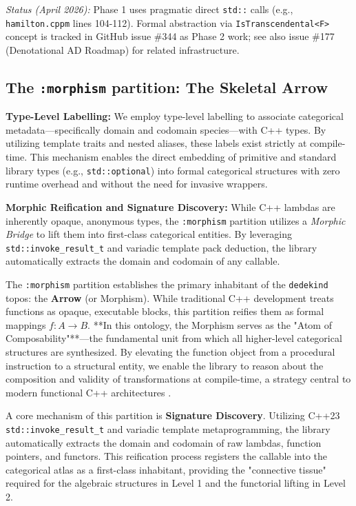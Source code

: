 \documentclass[11pt, a4paper]{report}
\begin{document}
\noindent \emph{Status (April 2026):} Phase 1 uses pragmatic direct \texttt{std::} calls (e.g., \texttt{hamilton.cppm} lines 104-112). Formal abstraction via \texttt{IsTranscendental<F>} concept is tracked in GitHub issue \#344 as Phase 2 work; see also issue \#177 (Denotational AD Roadmap) for related infrastructure.




\subsection{The \texttt{:morphism} partition: The Skeletal Arrow}

\textbf{Type-Level Labelling:} We employ type-level labelling to associate categorical metadata---specifically domain and codomain species---with C++ types. By utilizing template traits and nested aliases, these labels exist strictly at compile-time. This mechanism enables the direct embedding of primitive and standard library types (e.g., \texttt{std::optional}) into formal categorical structures with zero runtime overhead and without the need for invasive wrappers.

\textbf{Morphic Reification and Signature Discovery:} While C++ lambdas are inherently opaque, anonymous types, the \texttt{:morphism} partition utilizes a \textit{Morphic Bridge} to lift them into first-class categorical entities. By leveraging \texttt{std::invoke\_result\_t} and variadic template pack deduction, the library automatically extracts the domain and codomain of any callable. 


The \texttt{:morphism} partition establishes the primary inhabitant of the \texttt{dedekind} topos: the \textbf{Arrow} (or Morphism). While traditional C++ development treats functions as opaque, executable blocks, this partition reifies them as formal mappings $f: A \to B$. **In this ontology, the Morphism serves as the "Atom of Composability"**---the fundamental unit from which all higher-level categorical structures are synthesized. By elevating the function object from a procedural instruction to a structural entity, we enable the library to reason about the composition and validity of transformations at compile-time, a strategy central to modern functional C++ architectures \cite{cukic2018functional, milewski2019category}.

A core mechanism of this partition is \textbf{Signature Discovery}. Utilizing C++23 \texttt{std::invoke\_result\_t} and variadic template metaprogramming, the library automatically extracts the domain and codomain of raw lambdas, function pointers, and functors. This reification process registers the callable into the categorical atlas as a first-class inhabitant, providing the "connective tissue" required for the algebraic structures in Level 1 and the functorial lifting in Level 2. 
\end{document}
